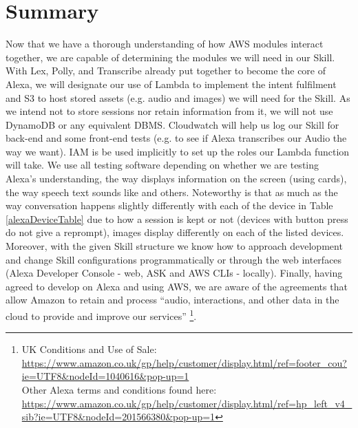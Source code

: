 \section{Summary}
Now that we have a thorough understanding of how AWS modules interact together, we are capable of determining the modules we will need in our Skill. With Lex, Polly, and Transcribe already put together to become the core of Alexa, we will designate our use of Lambda to implement the intent fulfilment and S3 to host stored assets (e.g. audio and images) we will need for the Skill. As we intend not to store sessions nor retain information from it, we will not use DynamoDB or any equivalent DBMS. Cloudwatch will help us log our Skill for back-end and some front-end tests (e.g. to see if Alexa transcribes our Audio the way we want). IAM is be used implicitly to set up the roles our Lambda function will take.  We use all testing software depending on whether we are testing Alexa's understanding, the way displays information on the screen (using cards), the way speech text sounds like and others. Noteworthy is that as much as the way conversation happens slightly differently with each of the device in Table \ref{alexaDeviceTable} due to how a session is kept or not (devices with button press do not give a reprompt), images display differently on each of the listed devices.%
Moreover, with the given Skill structure we know how to approach development and change Skill configurations %
programmatically
or through the web interfaces (Alexa Developer Console - web, ASK and AWS CLIs - locally). 
Finally, having agreed to develop on Alexa and using AWS, we are aware of the agreements that allow Amazon to retain and process ``audio, interactions, and other data in the cloud to provide and improve our services'' \footnote{UK Conditions and Use of Sale: \url{https://www.amazon.co.uk/gp/help/customer/display.html/ref=footer_cou?ie=UTF8&nodeId=1040616&pop-up=1}\\
Other Alexa terms and conditions found here: \url{https://www.amazon.co.uk/gp/help/customer/display.html/ref=hp_left_v4_sib?ie=UTF8&nodeId=201566380&pop-up=1}
}.


